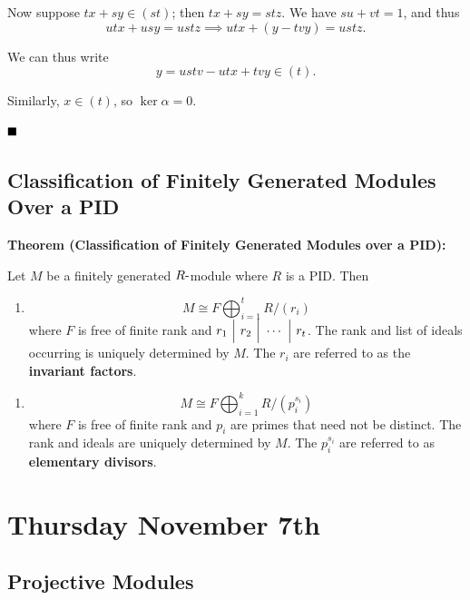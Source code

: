 Now suppose \(tx + sy \in (st)\); then \(tx + sy = stz\). We have
\(su + vt = 1\), and thus \[
utx + usy  = ustz \implies utx + (y-tvy) = ustz
.\]

We can thus write \[
y = ustv - utx + tvy  \in (t)
.\]

Similarly, \(x\in (t)\), so \(\ker \alpha = 0\).

\(\qed\)

\hypertarget{classification-of-finitely-generated-modules-over-a-pid}{%
\subsection{Classification of Finitely Generated Modules Over a
PID}\label{classification-of-finitely-generated-modules-over-a-pid}}

\textbf{Theorem (Classification of Finitely Generated Modules over a
PID):}

Let \(M\) be a finitely generated \(R{\hbox{-}}\)module where \(R\) is a PID.
Then

\begin{enumerate}
\def\labelenumi{\arabic{enumi}.}
\tightlist
\item
  \[
  M \cong F \bigoplus_{i=1}^t R/(r_i)
  \] where \(F\) is free of finite rank and
  \(r_1 {~\Bigm| ~} r_2 {~\Bigm| ~} \cdots {~\Bigm| ~} r_t\). The rank and list
  of ideals occurring is uniquely determined by \(M\). The \(r_i\) are
  referred to as the \textbf{invariant factors}.
\end{enumerate}

\begin{enumerate}
\def\labelenumi{\alph{enumi}.}
\setcounter{enumi}{1}
\tightlist
\item
  \[
  M \cong F \bigoplus_{i=1}^k R/(p_i^{s_i})
  \] where \(F\) is free of finite rank and \(p_i\) are primes that need
  not be distinct. The rank and ideals are uniquely determined by \(M\).
  The \(p_i^{s_i}\) are referred to as \textbf{elementary divisors}.
\end{enumerate}

\hypertarget{thursday-november-7th}{%
\section{Thursday November 7th}\label{thursday-november-7th}}

\hypertarget{projective-modules}{%
\subsection{Projective Modules}\label{projective-modules}}

